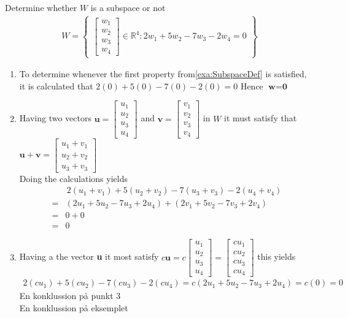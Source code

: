 \begin{example}{Determine whether $W$ is a subspace or not}
\begin{align*}
    W = \begin{Bmatrix}
    \begin{bmatrix}
    w_1\\w_2\\w_3\\w_4
    \end{bmatrix}
        \in \mathbb{R}^4: 2w_1 + 5w_2 - 7w_3 -2w_4 = 0 
    \end{Bmatrix}
\end{align*}
\begin{enumerate}
    \item To determine whenever the first property from\ref{exa:SubspaceDef} is satisfied, it is calculated that
    $2(0) + 5(0) - 7(0) -2(0) = 0 $ Hence $\textbf{w}=\textbf{0}$
    \item Having two vectors $\textbf{u}=\begin{bmatrix}
    u_1\\u_2\\u_3\\u_4\end{bmatrix}$ and $\textbf{v}=\begin{bmatrix}
    v_1\\v_2\\v_3\\v_4\end{bmatrix}$ in $W$ it must satisfy that $\textbf{u}+\textbf{v} = \begin{bmatrix}
    u_1 + v_1 \\ u_2 + v_2 \\ u_3 + v_3
    \end{bmatrix}$\\
    Doing the calculations yields
    \begin{align*}
        &\,2(u_1+v_1)+5(u_2+v_2)-7(u_3+v_3)-2(u_4+v_4)\\
        =& (2u_1+5u_2-7u_3+2u_4)+(2v_1+5v_2-7v_3+2v_4)\\ =& 0 + 0 \\=& 0
    \end{align*}
    \item Having a the vector \textbf{u} it most satisfy $c\textbf{u}=c\begin{bmatrix}
    u_1\\u_2\\u_3\\u_4\end{bmatrix}=
    \begin{bmatrix}
    cu_1\\cu_2\\cu_3\\cu_4\end{bmatrix}$ this yields
    \begin{align*}
       2(cu_1)+5(cu_2)-7(cu_3)-2(cu_4)=c(2u_1+5u_2-7u_3+2u_4)= c(0) = 0
    \end{align*}
    En konklussion på punkt 3 \\
    En konklussion på eksemplet
   
    
\end{enumerate}
\end{example}

